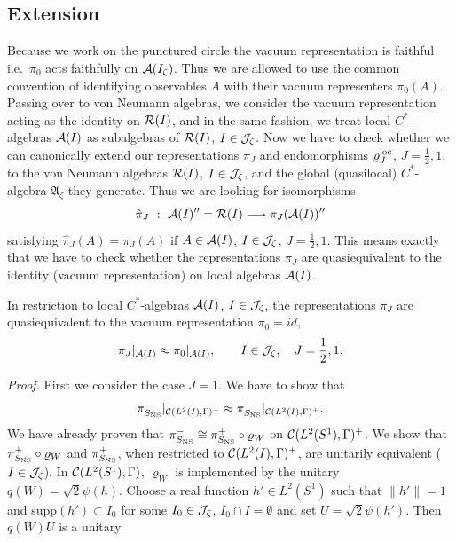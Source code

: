 \documentclass[10pt,a4paper]{article}
\begin{document}
\subsection{Extension}
Because we work on the punctured circle the
vacuum representation is faithful i.e.~$\pi_0$
acts faithfully on ${\cal A}(I_\zeta)$. Thus we
are allowed to use the common convention of
identifying observables $A$ with their vacuum
representers $\pi_0(A)$. Passing over to von
Neumann algebras, we consider the vacuum
representation acting as the identity on
${\cal R}(I)$, and in the same fashion, we treat
local $C^*$-algebras ${\cal A}(I)$ as subalgebras
of ${\cal R}(I)$, $I\in{\cal J}_\zeta$. Now
we have to check whether we can canonically
extend our representations $\pi_J$ and
endomorphisms $\varrho_J^{\rm loc}$,
$J=\frac{1}{2},1$, to the von Neumann algebras
${\cal R}(I)$, $I\in{\cal J}_\zeta$, and the
global (quasilocal) $C^*$-algebra $\mathfrak{A}_\zeta$
they generate. Thus we are looking for
isomorphisms
\[ \hat{\pi}_J \,\,: \,\, {\cal A}(I)''=
{\cal R}(I) \longrightarrow \pi_J({\cal A}(I))'' \]
satisfying $\hat{\pi}_J(A)=\pi_J(A)$ if
$A\in{\cal A}(I)$, $I\in{\cal J}_\zeta$,
$J=\frac{1}{2},1$. This means exactly that we have
to check whether the representations $\pi_J$ are
quasiequivalent to the identity (vacuum
representation) on local algebras ${\cal A}(I)$.
\begin{theorem}
\label{locnorm}
In restriction to local $C^*$-algebras ${\cal A}(I)$,
$I\in{\cal J}_\zeta$, the representations $\pi_J$ are
quasiequivalent to the vacuum representation
$\pi_0=id$,
\begin{equation}
\pi_J|_{{\cal A}(I)} \approx \pi_0|_{{\cal A}(I)},
\qquad I\in{\cal J}_\zeta,\quad J=\frac{1}{2},1.
\end{equation}
\end{theorem}
{\it Proof.} First we consider the case $J=1$. We
have to show that
\[ \pi_{S_{\rm NS}}^-|_{{\cal C}(L^2(I),\Gamma)^+}
\approx \pi_{S_{\rm NS}}^+|_{{\cal C}(L^2(I),\Gamma)^+}.\]
We have already proven that $\pi_{S_{\rm NS}}^-\cong
\pi_{S_{\rm NS}}^+\circ\varrho_W$ on
${\cal C}(L^2(S^1),\Gamma)^+$. We show that
$\pi_{S_{\rm NS}}^+\circ\varrho_W$ and $\pi_{S_{\rm NS}}^+$,
when restricted to ${\cal C}(L^2(I),\Gamma)^+$,
are unitarily equivalent ($I\in{\cal J}_\zeta$).
In ${\cal C}(L^2(S^1),\Gamma)$, $\varrho_W$ is
implemented by the unitary $q(W)=\sqrt{2}\psi(h)$.
Choose a real function $h'\in L^2(S^1)$ such that
$\|h'\|=1$ and supp$(h')\subset I_0$ for some
$I_0\in{\cal J}_\zeta$, $I_0\cap I=\emptyset$ and
set $U=\sqrt{2}\psi(h')$. Then $q(W)U$ is a unitary
\end{document}
